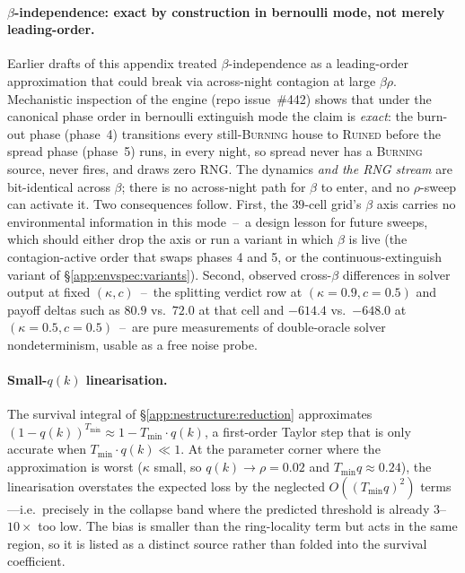 \documentclass{anvil-paper}
\begin{document}
\paragraph{$\beta$-independence: exact by construction in bernoulli
mode, not merely leading-order.}
Earlier drafts of this appendix treated $\beta$-independence as a
leading-order approximation that could break via across-night
contagion at large $\beta\rho$. Mechanistic inspection of the engine
(repo issue~\#442) shows that under the canonical phase order in
bernoulli extinguish mode the claim is \emph{exact}: the burn-out
phase (phase~4) transitions every still-\textsc{Burning} house to
\textsc{Ruined} before the spread phase (phase~5) runs, in every
night, so spread never has a \textsc{Burning} source, never fires,
and draws zero RNG. The dynamics \emph{and the RNG stream} are
bit-identical across $\beta$; there is no across-night path for
$\beta$ to enter, and no $\rho$-sweep can activate it. Two
consequences follow. First, the $39$-cell grid's $\beta$ axis carries
no environmental information in this mode~--~a design lesson for
future sweeps, which should either drop the axis or run a variant in
which $\beta$ is live (the contagion-active order that swaps phases
4 and 5, or the continuous-extinguish variant of
\S\ref{app:envspec:variants}). Second, observed cross-$\beta$
differences in solver output at fixed $(\kappa,c)$~--~the splitting
verdict row at $(\kappa{=}0.9,c{=}0.5)$ and payoff deltas such as
$80.9$ vs.\ $72.0$ at that cell and $-614.4$ vs.\ $-648.0$ at
$(\kappa{=}0.5,c{=}0.5)$~--~are pure measurements of double-oracle
solver nondeterminism, usable as a free noise probe.

\paragraph{Small-$q(k)$ linearisation.}
The survival integral of \S\ref{app:nestructure:reduction} approximates
$(1-q(k))^{T_{\min}}\approx 1-T_{\min}\cdot q(k)$, a first-order Taylor
step that is only accurate when $T_{\min}\cdot q(k)\ll 1$. At the
parameter corner where the approximation is worst ($\kappa$ small, so
$q(k)\to\rho{=}0.02$ and $T_{\min}q\approx 0.24$), the linearisation
overstates the expected loss by the neglected
$O\!\left((T_{\min}q)^2\right)$ terms---i.e.\ precisely in the collapse
band where the predicted threshold is already $3$--$10{\times}$ too
low. The bias is smaller than the ring-locality term but acts in the
same region, so it is listed as a distinct source rather than folded
into the survival coefficient.
\end{document}
